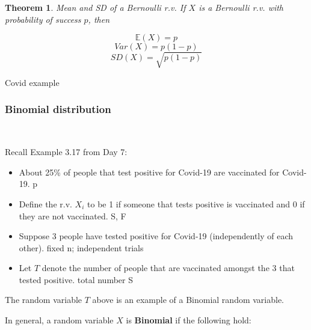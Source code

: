 \documentclass[12pt]{amsart}
\newtheorem{theorem}{Theorem}[section]
\begin{document}
{%

\begin{theorem}{Mean and SD of a Bernoulli r.v.} \newline
If $X$ is a Bernoulli r.v. with probability of success $p$, then 

\color{blue}
$$\mathbb{E}(X) = p$$
$$Var(X) = p(1-p)$$
$$SD(X) =  \sqrt{p(1-p)}$$
\color{black}


\end{theorem}


\color{blue}
Covid example
\color{black}


\newpage
\subsubsection{Binomial distribution}  $ \ $



\vspace{0.5cm}
Recall Example 3.17 from Day 7:
\begin{itemize}
\item About 25\% of people that test positive for Covid-19 are vaccinated for Covid-19.
\color{blue}p\color{black}
\item Define the r.v. $X_i$ to be 1 if someone that tests positive is vaccinated and 0 if they are not vaccinated. 
\color{blue}S, F\color{black}
\item Suppose 3 people have tested positive for Covid-19 (independently of each other). 
\color{blue}fixed n; independent trials\color{black}
\item Let $T$ denote the number of people that are vaccinated amongst the 3 that tested positive.
\color{blue}total number S\color{black}
\end{itemize}

\vspace{0.5cm}
The random variable $T$ above is an example of a Binomial random variable. \newline

\vspace{0.5cm}

In general, a random variable $X$ is \textbf{Binomial} if the following hold:

}
\end{document}
